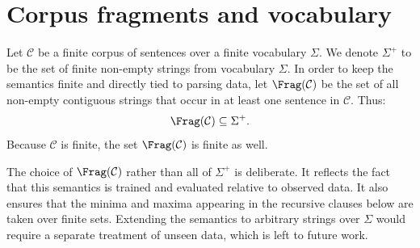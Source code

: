 \section{Corpus fragments and vocabulary}
Let $\mathcal C$ be a finite corpus of sentences over a finite vocabulary $\Sigma$. We denote $\Sigma^+$ to be the set of finite non-empty strings from vocabulary $\Sigma$. In order to keep the
semantics finite and directly tied to parsing data, let $\Frag(\mathcal C)$ be the set of all non-empty
contiguous strings that occur in at least one sentence in $\mathcal C$. Thus:
\[
\Frag(\mathcal C) \subseteq \Sigma^+.
\]
Because $\mathcal C$ is finite, the set $\Frag(\mathcal C)$ is finite as well.

The choice of $\Frag(\mathcal C)$ rather than all of $\Sigma^+$ is deliberate. It reflects the fact that
this semantics is trained and evaluated relative to observed data. It also ensures that the minima
and maxima appearing in the recursive clauses below are taken over finite sets. Extending the
semantics to arbitrary strings over $\Sigma$ would require a separate treatment of unseen data,
which is left to future work.

